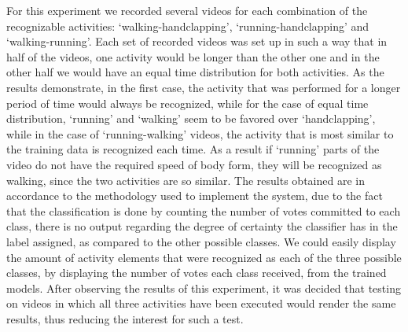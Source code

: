 \documentclass[11pt]{report}
\begin{document}
For this experiment we recorded several videos for each combination of the recognizable activities: `walking-handclapping', `running-handclapping' and `walking-running'. Each set of recorded videos was set up in such a way that in half of the videos, one activity would be longer than the other one and in the other half we would have an equal time distribution for both activities. As the results demonstrate, in the first case, the activity that was performed for a longer period of time would always be recognized, while for the case of equal time distribution, `running' and `walking' seem to be favored over `handclapping', while in the case of `running-walking' videos, the activity that is most similar to the training data is recognized each time. As a result if `running' parts of the video do not have the required speed of body form, they will be recognized as walking, since the two activities are so similar. The results obtained are in accordance to the methodology used to implement the system, due to the fact that the classification is done by counting the number of votes committed to each class, there is no output regarding the degree of certainty the classifier has in the label assigned, as compared to the other possible classes. We could easily display the amount of activity elements that were recognized as each of the three possible classes, by displaying the number of votes each class received, from the trained models. After observing the results of this experiment, it was decided that testing on videos in which all three activities have been executed would render the same results, thus reducing the interest for such a test. \\
\end{document}
